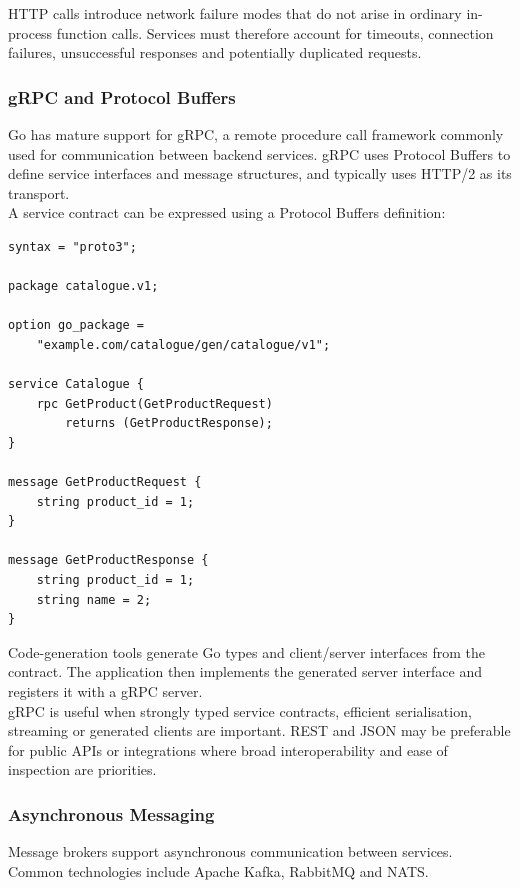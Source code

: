 HTTP calls introduce network failure modes that do not arise in ordinary in-process function calls. Services must therefore account for timeouts, connection failures, unsuccessful responses and potentially duplicated requests.

\subsubsection{gRPC and Protocol Buffers}

Go has mature support for gRPC, a remote procedure call framework commonly used for communication between backend services. gRPC uses Protocol Buffers to define service interfaces and message structures, and typically uses HTTP/2 as its transport.\\

A service contract can be expressed using a Protocol Buffers definition:

\begin{lstlisting}
syntax = "proto3";

package catalogue.v1;

option go_package =
    "example.com/catalogue/gen/catalogue/v1";

service Catalogue {
    rpc GetProduct(GetProductRequest)
        returns (GetProductResponse);
}

message GetProductRequest {
    string product_id = 1;
}

message GetProductResponse {
    string product_id = 1;
    string name = 2;
}
\end{lstlisting}

Code-generation tools generate Go types and client/server interfaces from the contract. The application then implements the generated server interface and registers it with a gRPC server.\\

gRPC is useful when strongly typed service contracts, efficient serialisation, streaming or generated clients are important. REST and JSON may be preferable for public APIs or integrations where broad interoperability and ease of inspection are priorities.

\subsubsection{Asynchronous Messaging}

Message brokers support asynchronous communication between services. Common technologies include Apache Kafka, RabbitMQ and NATS.\\

